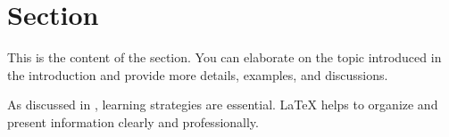 \section{Section}

This is the content of the section. You can elaborate on the topic introduced in the introduction and provide more details, examples, and discussions.

As discussed in \cite{knuth1984texbook}, learning strategies are essential. \LaTeX{} helps to organize and present information clearly and professionally.
